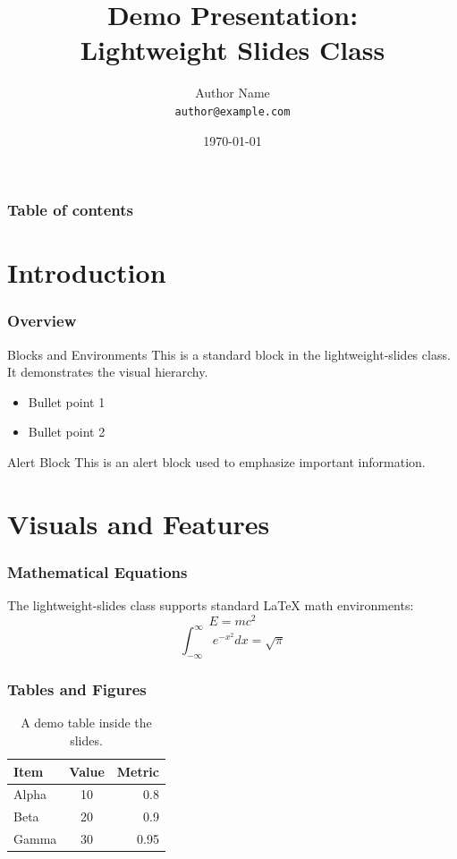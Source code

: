 \documentclass[uft8,aspectratio=169]{lightweight-slides}
\title{%
    Demo Presentation:\\
    Lightweight Slides Class
}
\author[Author Name]{%
    Author Name\\
    \texttt{author@example.com}%
}
\institute[
    Institution
]{%
    University of Example%
}
\date{%
    \today%
}
\begin{document}
    \nobibliography*

    \frame{\titlepage}

    \begin{frame}
        \frametitle{Table of contents}
        \tableofcontents
    \end{frame}

    \section{Introduction}
    \label{sec:introduction}

    \begin{frame}
        \frametitle{Overview}
        \begin{block}{Blocks and Environments}
            This is a standard block in the lightweight-slides class. It demonstrates the visual hierarchy.
            \begin{itemize}
                \item Bullet point 1
                \item Bullet point 2
            \end{itemize}
        \end{block}
        
        \begin{alertblock}{Alert Block}
            This is an alert block used to emphasize important information.
        \end{alertblock}
    \end{frame}

    \section{Visuals and Features}
    \label{sec:visuals}

    \begin{frame}
        \frametitle{Mathematical Equations}
        The lightweight-slides class supports standard LaTeX math environments:
        \begin{equation*}
            E = mc^2
        \end{equation*}
        \begin{equation*}
            \int_{-\infty}^{\infty} e^{-x^2} dx = \sqrt{\pi}
        \end{equation*}
    \end{frame}

    \begin{frame}
        \frametitle{Tables and Figures}
        \begin{table}[!ht]
            \centering
            \caption{A demo table inside the slides.}
            \begin{tabular}{l c r}
                \hline
                \textbf{Item} & \textbf{Value} & \textbf{Metric} \\
                \hline
                Alpha & 10 & 0.8 \\
                Beta  & 20 & 0.9 \\
                Gamma & 30 & 0.95 \\
                \hline
            \end{tabular}
        \end{table}
    \end{frame}
\end{document}
